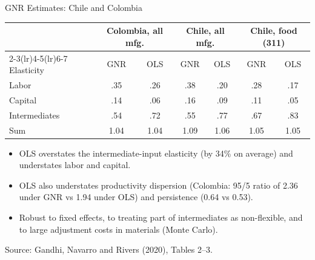 \documentclass[aspectratio=169,10pt]{beamer}
\begin{document}
\begin{frame}{GNR Estimates: Chile and Colombia}
\small
\begin{center}
\renewcommand{\arraystretch}{1.15}
\begin{tabular}{lcccccc}
\toprule
& \multicolumn{2}{c}{Colombia, all mfg.} & \multicolumn{2}{c}{Chile, all mfg.} & \multicolumn{2}{c}{Chile, food (311)} \\
\cmidrule(lr){2-3}\cmidrule(lr){4-5}\cmidrule(lr){6-7}
Elasticity & GNR & OLS & GNR & OLS & GNR & OLS \\
\midrule
Labor & .35 & .26 & .38 & .20 & .28 & .17 \\
Capital & .14 & .06 & .16 & .09 & .11 & .05 \\
Intermediates & .54 & .72 & .55 & .77 & .67 & .83 \\
Sum & 1.04 & 1.04 & 1.09 & 1.06 & 1.05 & 1.05 \\
\bottomrule
\end{tabular}
\end{center}
\begin{itemize}
\item OLS overstates the intermediate-input elasticity (by 34\% on average) and understates labor and capital.
\item OLS also understates productivity dispersion (Colombia: 95/5 ratio of 2.36 under GNR vs 1.94 under OLS) and persistence (0.64 vs 0.53).
\item Robust to fixed effects, to treating part of intermediates as non-flexible, and to large adjustment costs in materials (Monte Carlo).
\end{itemize}
{\footnotesize Source: Gandhi, Navarro and Rivers (2020), Tables 2--3.}
\end{frame}
\end{document}
